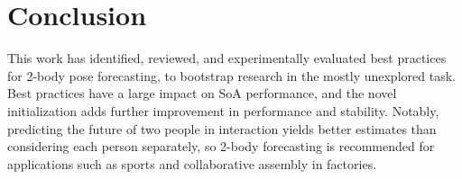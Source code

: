 \documentclass[10pt,twocolumn,letterpaper]{article}
\begin{document}
\begin{table}[!htb]
\centering
{}
\caption{Initialization procedures for best practices model.}
\label{tab:init}
\end{table}

%
 
 
\section{Conclusion}

This work has identified, reviewed, and experimentally evaluated best practices for 2-body pose forecasting, to bootstrap research in the mostly unexplored task. Best practices have a large impact on SoA performance, and the novel initialization adds further improvement in performance and stability. Notably, predicting the future of two people in interaction yields better estimates than considering each person separately, so 2-body forecasting is recommended for applications such as sports and collaborative assembly in factories.
 
{\small


}
\end{document}
